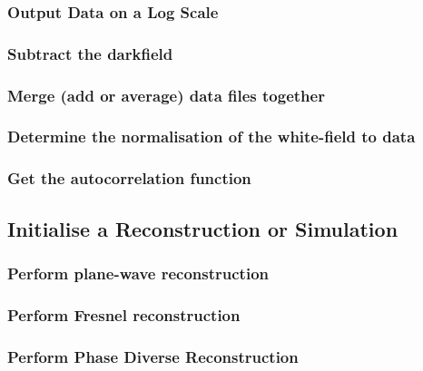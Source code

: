 \documentclass[]{cxs-software}
\begin{document}
\subsubsection{Output Data on a Log Scale}

\subsubsection{Subtract the darkfield}

\subsubsection{Merge (add or average) data files together}

\subsubsection{Determine the normalisation of the white-field to data}

\subsubsection{Get the autocorrelation function}


\subsection{Initialise a Reconstruction or Simulation}

\subsubsection{Perform plane-wave reconstruction}
\label{subsubsec:rec_planar}

\subsubsection{Perform Fresnel reconstruction}
\label{subsubsec:rec_fresnel}

\subsubsection{Perform Phase Diverse Reconstruction}
\label{subsubsec:rec_phase_div}
\end{document}
